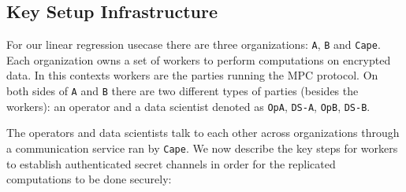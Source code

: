 \subsection{Key Setup Infrastructure}

For our linear regression usecase there are three organizations: \verb|A|,
\verb|B| and \verb|Cape|.  Each organization owns a set of workers to perform
computations on encrypted data.  In this contexts workers are the parties
running the MPC protocol.  On both sides of \verb|A| and \verb|B| there are
two different types of parties (besides the workers): an operator and a data
scientist denoted as \verb|OpA|, \verb|DS-A|, \verb|OpB|, \verb|DS-B|.

The operators and data scientists talk to each other across organizations through a
communication service ran by \verb|Cape|.
We now describe the key steps for workers to establish authenticated secret
channels in order for the replicated computations to be done securely:
